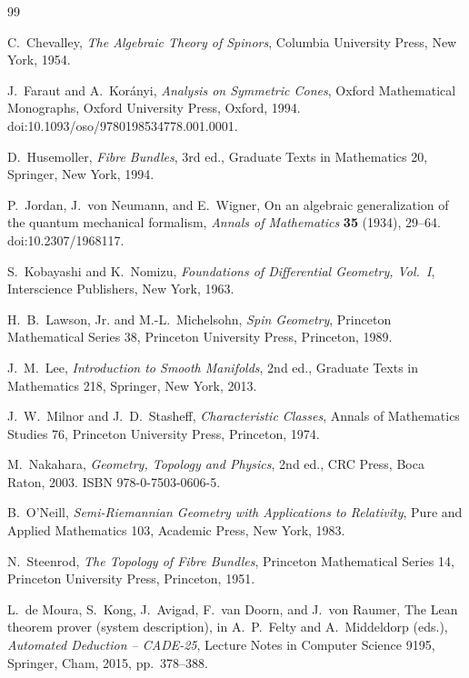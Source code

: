\documentclass[11pt,a4paper]{article}
\theoremstyle{definition}
\theoremstyle{remark}
\begin{document}
\small
\setlength{\emergencystretch}{2em}
\begin{thebibliography}{99}

C.~Chevalley,
\emph{The Algebraic Theory of Spinors},
Columbia University Press, New York, 1954.

J.~Faraut and A.~Kor\'anyi,
\emph{Analysis on Symmetric Cones},
Oxford Mathematical Monographs,
Oxford University Press, Oxford, 1994.
doi:10.1093/oso/9780198534778.001.0001.

D.~Husemoller,
\emph{Fibre Bundles},
3rd ed., Graduate Texts in Mathematics 20,
Springer, New York, 1994.

P.~Jordan, J.~von Neumann, and E.~Wigner,
On an algebraic generalization of the quantum mechanical formalism,
\emph{Annals of Mathematics} \textbf{35} (1934), 29--64.
doi:10.2307/1968117.

S.~Kobayashi and K.~Nomizu,
\emph{Foundations of Differential Geometry, Vol.~I},
Interscience Publishers, New York, 1963.

H.~B.~Lawson, Jr. and M.-L.~Michelsohn,
\emph{Spin Geometry},
Princeton Mathematical Series 38,
Princeton University Press, Princeton, 1989.

J.~M.~Lee,
\emph{Introduction to Smooth Manifolds},
2nd ed., Graduate Texts in Mathematics 218,
Springer, New York, 2013.

J.~W.~Milnor and J.~D.~Stasheff,
\emph{Characteristic Classes},
Annals of Mathematics Studies 76,
Princeton University Press, Princeton, 1974.

M.~Nakahara,
\emph{Geometry, Topology and Physics},
2nd ed., CRC Press, Boca Raton, 2003.
ISBN 978-0-7503-0606-5.

B.~O'Neill,
\emph{Semi-Riemannian Geometry with Applications to Relativity},
Pure and Applied Mathematics 103,
Academic Press, New York, 1983.

N.~Steenrod,
\emph{The Topology of Fibre Bundles},
Princeton Mathematical Series 14,
Princeton University Press, Princeton, 1951.

L.~de Moura, S.~Kong, J.~Avigad, F.~van Doorn, and J.~von Raumer,
The Lean theorem prover (system description),
in A.~P.~Felty and A.~Middeldorp (eds.),
\emph{Automated Deduction -- CADE-25},
Lecture Notes in Computer Science 9195,
Springer, Cham, 2015, pp.~378--388.


\end{thebibliography}
\end{document}
